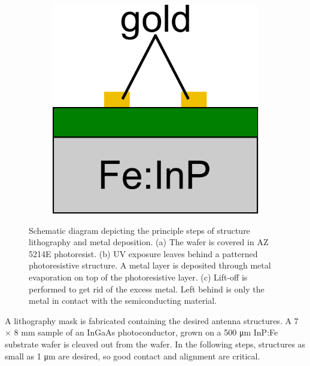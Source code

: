 \begin{figure}[h]
\begin{subfigure}[b]{0.225\textwidth}
        \caption{}
        \label{fig:fab12}
    \end{subfigure}
    \hfill
    \begin{subfigure}[b]{0.225\textwidth}
        \centering
        \includegraphics[width=\textwidth]{figures/Fabrication/fab1_3.pdf}
        \caption{}
        \label{fig:fab13}
    \end{subfigure}
    \caption{Schematic diagram depicting the principle steps of structure lithography and metal deposition. (a) The wafer is covered in AZ 5214E photoresist. (b) UV exposure leaves behind a patterned photoresistive structure. A metal layer is deposited through metal evaporation on top of the photoresistive layer. (c) Lift-off is performed to get rid of the excess metal. Left behind is only the metal in contact with the semiconducting material.}
\end{figure}

A lithography mask is fabricated containing the desired antenna structures. A \num{7} $\times$ \num{8} \si{\milli\meter} sample of an InGaAs photoconductor, grown on a \num{500} \si{\micro\meter} InP:Fe substrate wafer is cleaved out from the wafer. In the following steps, structures as small as \num{1} \si{\micro\meter} are desired, so good contact and alignment are critical.


